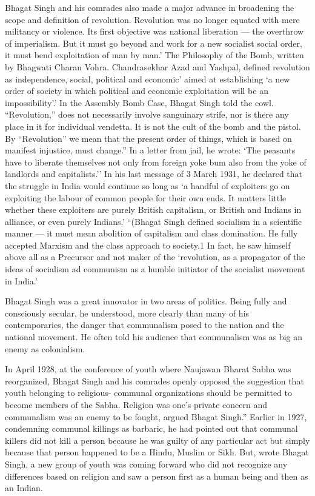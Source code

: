 Bhagat Singh and his comrades also made a major advance in broadening the scope and definition of revolution. Revolution was no longer equated with mere militancy or violence. Its first objective was national liberation — the overthrow of imperialism. But it must go beyond and work for a new socialist social order, it must bend exploitation of man by man.' The Philosophy of the Bomb, written by Bhagwati Charan Vohra. Chandrasekhar Azad and Yashpal, defined revolution as independence, social, political and economic' aimed at establishing `a new order of society in which political and economic exploitation will be an impossibility'.' In the Assembly Bomb Case, Bhagat Singh told the cowl. ``Revolution,'' does not necessarily involve sanguinary strife, nor is there any place in it for individual vendetta. It is not the cult of the bomb and the pistol. By ``Revolution'' we mean that the present order of things, which is based on manifest injustice, must change.'' In a letter from jail, he wrote: `The peasants have to liberate themselves not only from foreign yoke bum also from the yoke of landlords and capitalists.'' In his last message of 3 March 1931, he declared that the struggle in India would continue so long as `a handful of exploiters go on exploiting the labour of common people for their own ends. It matters little whether these exploiters are purely British capitalism, or British and Indians in alliance, or even purely Indians.' ``(Bhagat Singh defined socialism in a scientific manner — it must mean abolition of capitalism and class domination. He fully accepted Marxism and the class approach to society.1 In fact, he saw himself above all as a Precursor and not maker of the `revolution, as a propagator of the ideas of socialism ad communism as a humble initiator of the socialist movement in India.'

Bhagat Singh was a great innovator in two areas of politics. Being fully and consciously secular, he understood, more clearly than many of his contemporaries, the danger that communalism posed to the nation and the national movement. He often told his audience that communalism was as big an enemy as colonialism.

In April 1928, at the conference of youth where Naujawan Bharat Sabha was reorganized, Bhagat Singh and his comrades openly opposed the suggestion that youth belonging to religious- communal organizations should be permitted to become members of the Sabha. Religion was one's private concern and communalism was an enemy to be fought, argued Bhagat Singh.'' Earlier in 1927, condemning communal killings as barbaric, he had pointed out that communal killers did not kill a person because he was guilty of any particular act but simply because that person happened to be a Hindu, Muslim or Sikh. But, wrote Bhagat Singh, a new group of youth was coming forward who did not recognize any differences based on religion and saw a person first as a human being and then as an Indian.

